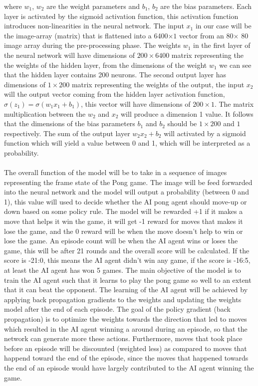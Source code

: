\documentclass[12pt,a4paper]{article}
\begin{document}
\noindent where $w_1$, $w_2$ are the weight parameters and $b_1$, $b_2$ are the bias parameters. Each layer is activated by the sigmoid activation function, this activation function introduces non-linearities in the 
neural network. The input $x_1$ in our case will be the image-array (matrix) that is flattened into a 6400$\times 1$ vector from an 80$\times$ 80 image array during the pre-processing phase. The weights $w_1$ in the first layer of the neural network will have dimensions of $200\times 6400$ matrix representing the the weights of the hidden layer, from the dimensions of the weight $w_1$ we can see that the hidden layer contains 200 neurons. The second output layer has dimensions of $1\times 200$ matrix representing the weights of the output, the input $x_2$ will the output vector coming from the hidden layer activation function, $\sigma(z_1)=\sigma(w_1x_1+b_1)$, this vector will have dimensions of $200\times 1$. The matrix multiplication between the $w_2$ and $x_2$ will produce a dimension 1 value. It follows that the dimensions of the bias parameters $b_1$ and $b_2$ should be $1\times 200$ and $1$ respectively. The sum of the output layer $w_2x_2+b_2$ will activated by a sigmoid function which will yield a value between 0 and 1, which will be interpreted as a probability.\\
\\
The  overall function of the model will be to take in a sequence of images representing the frame state of the Pong game. The image will be feed forwarded into the neural network and the model will output a probability (between 0 and 1), this value will used to decide whether the AI pong agent should move-up or down based on some policy rule. The model will be rewarded +1 if it makes a move that helps it win the game, it will get -1 reward for moves that makes it lose the game, and the 0 reward will be when the move doesn't help to win or lose the game. An episode count will be when the AI agent wins or loses the game, this will be after 21 rounds and the overall score will be calculated. If the score is -21:0, this means the AI agent didn't win any game, if the score is -16:5, at least the AI agent has won 5 games. The main objective of the model is to train the AI agent such that it learns to play the pong game so well to an extent that it can beat the opponent. The learning of the AI agent will be achieved by applying back propagation gradients to the weights and updating the weights model after the end of each episode. The goal of the policy gradient (back propagation) is to optimize the weights towards the direction that led to moves which resulted in the AI agent winning a around during an episode, so that the network can generate more these actions. Furthermore, moves that took place before an episode will be discounted (weighted less) as compared to moves that happend toward the end of the episode, since the moves that happened towards the end of an episode would have largely contributed to the AI agent winning the game.\\
\end{document}
